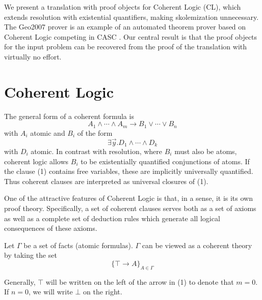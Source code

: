 \documentclass[a4paper,11pt]{article}
\begin{document}
\newpage
We present a translation with proof objects for Coherent Logic (CL), which extends resolution 
with existential quantifiers, making skolemization unnecessary.  The Geo2007 prover
is an example of an automated theorem prover based on Coherent Logic competing in CASC 
\cite{CASC:06}.  Our central result is that the proof objects
for the input problem can be recovered from the proof of the translation with
virtually no effort.

\section{Coherent Logic}

The general form of a coherent formula is 
\begin{equation}
A_1 \land \cdots \land A_m \to
B_1 \lor \cdots \lor B_n
\end{equation}
with $A_i$ atomic and $B_i$ of the form
\[\exists \vec y. D_1 \land \cdots \land D_k\]
with $D_i$ atomic.  In contrast with resolution, where $B_i$ must also be atoms,
coherent logic allows $B_i$ to be existentially quantified conjunctions of atoms.
If the clause (1) contains free variables, these are implicitly 
universally quantified.  Thus coherent clauses are interpreted as 
universal closures of (1).

One of the attractive features of Coherent Logic is that, in a sense, it is its
own proof theory.  Specifically, a set of coherent clauses serves both as a set of
axioms as well as a complete set of deduction rules which generate all logical
consequences of these axioms.  

\begin{dfn} \label{clAxs}
Let $\Gamma$ be a set of facts (atomic formulas).  
$\Gamma$ can be viewed as a coherent theory by
taking the set
\[\{\top \to A\}_{A \in \Gamma}\]
\end{dfn}

Generally, $\top$ will be written on the left of the arrow in (1) to denote 
that $m=0$.  If $n=0$, we will write $\bot$ on the right.  
\end{document}
